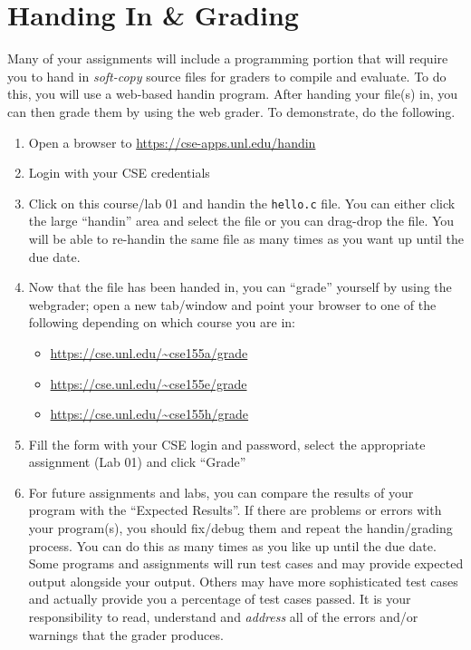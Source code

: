 \documentclass[12pt]{scrartcl}
\begin{document}
\section{Handing In \& Grading}

Many of your assignments will include a programming portion that will 
require you to hand in \emph{soft-copy} source files for graders to compile 
and evaluate.  To do this, you will use a web-based handin program.  
After handing your file(s) in, you can then grade them by using the
web grader.  To demonstrate, do the following.

\begin{enumerate}
  \item Open a browser to \url{https://cse-apps.unl.edu/handin}
  \item Login with your CSE credentials
  \item Click on this course/lab 01 and handin the \texttt{hello.c} file.  You can
  either click the large ``handin'' area and select the file or you can drag-drop
  the file.  You will be able to re-handin the same file as many times as you want up until
  the due date.
  \item Now that the file has been handed in, you can ``grade'' yourself by using
  the webgrader; open a new tab/window and point your browser to one of the following
  depending on which course you are in:
  \begin{itemize}
    \item \url{https://cse.unl.edu/~cse155a/grade}
    \item \url{https://cse.unl.edu/~cse155e/grade}
    \item \url{https://cse.unl.edu/~cse155h/grade}
  \end{itemize}
  \item Fill the form with your CSE login and password, select the appropriate assignment (Lab 01)
  	and click ``Grade''
  \item For future assignments and labs, you can compare the results of 
  	your program with the ``Expected Results''.  If there are problems or errors with
	your program(s), you should fix/debug them and repeat the handin/grading process.
	You can do this as many times as you like up until the due date.  Some programs 
	and assignments will run test cases and may provide expected output alongside 
	your output.  Others may have more sophisticated test cases and actually provide 
	you a percentage of test cases passed.  It is your responsibility to read, 
	understand and \emph{address} all of the errors and/or warnings that the grader produces.
\end{enumerate}
\end{document}
